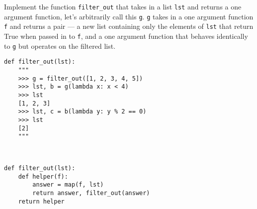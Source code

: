 \begin{blocksection}
\question Implement the function \lstinline$filter_out$ that takes in a list \lstinline$lst$ and returns a one argument function, let’s arbitrarily call this \lstinline$g$. \lstinline$g$ takes in a one argument function \lstinline$f$  and returns a pair — a new list containing only the elements of \lstinline$lst$ that return True when passed in to \lstinline$f$, and a one argument function that behaves identically to \lstinline$g$ but operates on the filtered list.

\begin{lstlisting}
def filter_out(lst):
    """
    >>> g = filter_out([1, 2, 3, 4, 5])
    >>> lst, b = g(lambda x: x < 4)
    >>> lst
    [1, 2, 3]
    >>> lst, c = b(lambda y: y % 2 == 0)
    >>> lst
    [2]
    """

    
\end{lstlisting}

\begin{solution}[1.5in]
\begin{lstlisting}
def filter_out(lst):
    def helper(f):
        answer = map(f, lst)
        return answer, filter_out(answer)
    return helper
\end{lstlisting}
\end{solution}
\end{blocksection}
